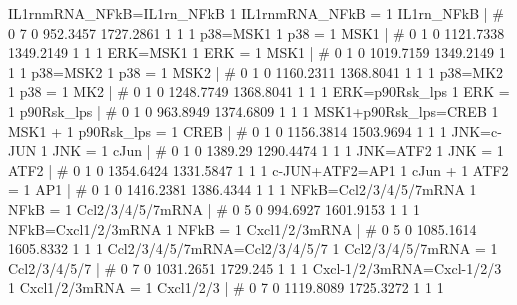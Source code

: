 IL1rnmRNA_NFkB=IL1rn_NFkB                           	1 IL1rnmRNA_NFkB = 1 IL1rn_NFkB 	| 	# 	0              7              0       952.3457      1727.2861              1              1              1 
p38=MSK1                                            	1 p38 = 1 MSK1 	| 	# 	0              1              0      1121.7338      1349.2149              1              1              1 
ERK=MSK1                                            	1 ERK = 1 MSK1 	| 	# 	0              1              0      1019.7159      1349.2149              1              1              1 
p38=MSK2                                            	1 p38 = 1 MSK2 	| 	# 	0              1              0      1160.2311      1368.8041              1              1              1 
p38=MK2                                             	1 p38 = 1 MK2 	| 	# 	0              1              0      1248.7749      1368.8041              1              1              1 
ERK=p90Rsk_lps                                      	1 ERK = 1 p90Rsk_lps 	| 	# 	0              1              0       963.8949      1374.6809              1              1              1 
MSK1+p90Rsk_lps=CREB                                	1 MSK1 + 1 p90Rsk_lps = 1 CREB 	| 	# 	0              1              0      1156.3814      1503.9694              1              1              1 
JNK=c-JUN                                           	1 JNK = 1 cJun 	| 	# 	0              1              0        1389.29      1290.4474              1              1              1 
JNK=ATF2                                            	1 JNK = 1 ATF2 	| 	# 	0              1              0      1354.6424      1331.5847              1              1              1 
c-JUN+ATF2=AP1                                      	1 cJun + 1 ATF2 = 1 AP1 	| 	# 	0              1              0      1416.2381      1386.4344              1              1              1 
NFkB=Ccl2/3/4/5/7mRNA                               	1 NFkB = 1 Ccl2/3/4/5/7mRNA 	| 	# 	0              5              0       994.6927      1601.9153              1              1              1 
NFkB=Cxcl1/2/3mRNA                                  	1 NFkB = 1 Cxcl1/2/3mRNA 	| 	# 	0              5              0      1085.1614      1605.8332              1              1              1 
Ccl2/3/4/5/7mRNA=Ccl2/3/4/5/7                       	1 Ccl2/3/4/5/7mRNA = 1 Ccl2/3/4/5/7 	| 	# 	0              7              0      1031.2651       1729.245              1              1              1 
Cxcl-1/2/3mRNA=Cxcl-1/2/3                           	1 Cxcl1/2/3mRNA = 1 Cxcl1/2/3 	| 	# 	0              7              0      1119.8089      1725.3272              1              1              1 

